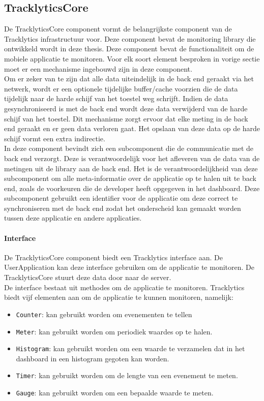 \subsection{TracklyticsCore}
De TracklyticsCore component vormt de belangrijkste component van de Tracklytics infrastructuur voor. Deze component bevat de monitoring library die ontwikkeld wordt in deze thesis. Deze component bevat de functionaliteit om de mobiele applicatie te monitoren. Voor elk soort element besproken in vorige sectie moet er een mechanisme ingebouwd zijn in deze component. \\

Om er zeker van te zijn dat alle data uiteindelijk in de back end geraakt via het netwerk, wordt er een optionele tijdelijke buffer/cache voorzien die de data tijdelijk naar de harde schijf van het toestel weg schrijft. Indien de data gesynchroniseerd is met de back end wordt deze data verwijderd van de harde schijf van het toestel. Dit mechanisme zorgt ervoor dat elke meting in de back end geraakt en er geen data verloren gaat. Het opslaan van deze data op de harde schijf vormt een extra indirectie.\\

In deze component bevindt zich een subcomponent die de communicatie met de back end verzorgt. Deze is verantwoordelijk voor het afleveren van de data van de metingen uit de library aan de back end. Het is de verantwoordelijkheid van deze subcomponent om alle meta-informatie over de applicatie op te halen uit te back end, zoals de voorkeuren die de developer heeft opgegeven in het dashboard. Deze subcomponent gebruikt een identifier voor de applicatie om deze correct te synchroniseren met de back end zodat het onderscheid kan gemaakt worden tussen deze applicatie en andere applicaties. 


\paragraph{Interface}
De TracklyticsCore component biedt een Tracklytics interface aan. De UserApplication kan deze interface gebruiken om de applicatie te monitoren. De TracklyticsCore stuurt deze data door naar de server.\\

De interface bestaat uit methodes om de applicatie te monitoren. Tracklytics biedt vijf elementen aan om de applicatie te kunnen monitoren, namelijk:
\begin{itemize}
\item \texttt{Counter}: kan gebruikt worden om evenementen te tellen
\item \texttt{Meter}: kan gebruikt worden om periodiek waardes op te halen.
\item \texttt{Histogram}: kan gebruikt worden om een waarde te verzamelen dat in het dashboard in een histogram gegoten kan worden. 
\item \texttt{Timer}: kan gebruikt worden om de lengte van een evenement te meten.
\item \texttt{Gauge}: kan gebruikt worden om een bepaalde waarde te meten. 
\end{itemize}

